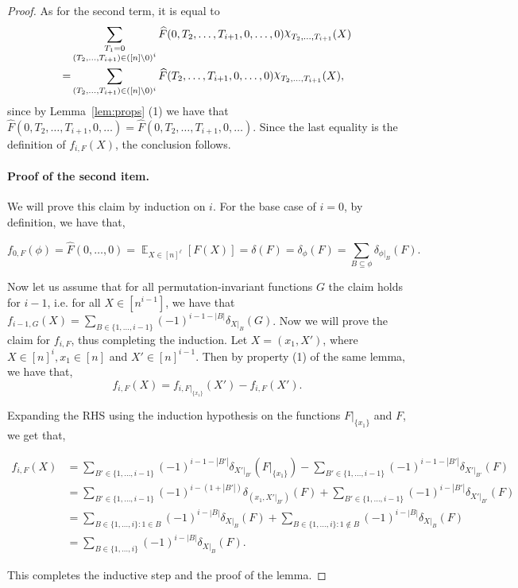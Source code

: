 \documentclass[11pt]{article}
\DeclareMathOperator*{\E}{\mathbb{E}}
\def \Chi {\raisebox{2pt}{$\chi$}}
\renewcommand{\hat}[1]{\widehat{#1}}
\theoremstyle{definition}
\begin{document}
\begin{proof}
As for the second term, it is equal to
\begin{align*}
&\sum_{ \substack{T_1 = 0 \\ (T_2,\ldots,T_{i+1}) \in ([n] \setminus 0)^i}}\widehat{F}(0, T_2,\ldots,T_{i+1},0,\ldots, 0)\Chi_{T_2,\ldots,T_{i+1}}(X)\\
= &\sum_{(T_2,\ldots,T_{i+1}) \in ([n] \setminus 0)^i}\hat{F}(T_2, \ldots,T_{i+1},0,\ldots, 0)\Chi_{T_2,\ldots,T_{i+1}}(X),
\end{align*}
since by Lemma~\ref{lem:props} (1) we have that $\hat{F}(0, T_2,\ldots,T_{i+1}, 0, \ldots) = \hat{F}(0, T_2,\ldots,T_{i+1}, 0, \ldots)$. Since the last equality is the definition of $f_{i,F}(X)$, the conclusion follows.



\paragraph{Proof of the second item.}
We will prove this claim by induction on $i$. For the base case of $i = 0$, by definition, we have that,

\[f_{0,F}(\phi) = \hat{F}(0,\ldots,0) = \E_{X \in [n]^\ell}[F(X)] = \delta(F) = \delta_{\phi}(F) = \sum_{B \subseteq \phi} \delta_{\phi|_B}(F).\]

Now let us assume that for all permutation-invariant functions $G$ the claim holds for $i-1$, i.e. for all $X \in [n^{i-1}]$, we have that $f_{i-1,G}(X) = \sum_{B \in \{1,\ldots,i-1\}} (-1)^{i-1-|B|} \delta_{X|_{B}}(G)$. Now we will prove the  claim for $f_{i,F}$, thus completing the induction.
Let $X = (x_1, X')$, where $X \in [n]^i, x_1 \in [n]$ and $X' \in [n]^{i-1}$. Then by property (1) of the same lemma, we have that,
\[f_{i,F}(X) = f_{i,F|_{\{x_1\}}}(X') - f_{i,F}(X').\]

Expanding the RHS using the induction hypothesis on the functions $F|_{\{x_1\}}$ and $F$, we get that,

\begin{align*}
f_{i,F}(X) &= \sum_{B' \in \{1,\ldots,i-1\}} (-1)^{i-1-|B'|} \delta_{X'|_{B'}}(F|_{\{x_1\}}) - \sum_{B' \in \{1,\ldots,i-1\}} (-1)^{i-1-|B'|} \delta_{X'|_{B'}}(F) \\
&= \sum_{B' \in \{1,\ldots,i-1\}} (-1)^{i-(1+|B'|)} \delta_{(x_1,X'|_{B'})}(F) + \sum_{B' \in \{1,\ldots,i-1\}} (-1)^{i-|B'|} \delta_{X'|_{B'}}(F) \\
&= \sum_{B \in \{1,\ldots,i\}: 1 \in B} (-1)^{i-|B|} \delta_{X|_B}(F) + \sum_{B \in \{1,\ldots,i\}: 1 \notin B} (-1)^{i-|B|} \delta_{X|_{B}}(F) \\
&= \sum_{B \in \{1,\ldots, i\}} (-1)^{i-|B|} \delta_{X|_B}(F).
\end{align*}

This completes the inductive step and the proof of the lemma.
\end{proof}
\end{document}

